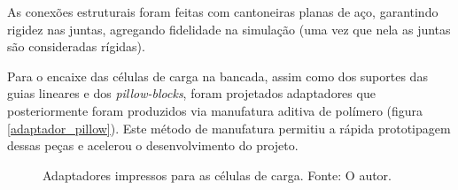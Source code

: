 
As conexões estruturais foram feitas com cantoneiras planas de aço, garantindo rigidez nas juntas, agregando fidelidade na simulação (uma vez que nela as juntas são consideradas rígidas).

Para o encaixe das células de carga na bancada, assim como dos suportes das guias lineares e dos \textit{pillow-blocks}, foram projetados adaptadores que posteriormente foram produzidos via manufatura aditiva de polímero (figura \ref{adaptador_pillow}). Este método de manufatura permitiu a rápida prototipagem dessas peças e acelerou o desenvolvimento do projeto.

\begin{figure}[!ht]
    \centering
    \caption{Adaptadores impressos para as células de carga. Fonte: O autor.}
        \label{encaixe_celulas_sustentacao}
        \qquad
        \label{encaixe_celulas_sustentacao_2}
\end{figure}

